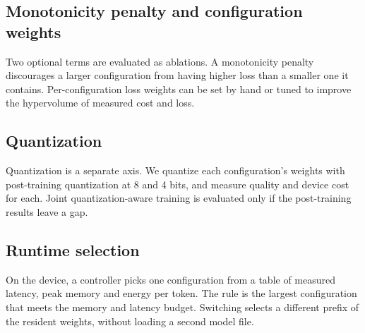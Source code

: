 \subsection{Monotonicity penalty and configuration weights}

Two optional terms are evaluated as ablations. A monotonicity penalty discourages a larger configuration from having higher loss than a smaller one it contains. Per-configuration loss weights can be set by hand or tuned to improve the hypervolume of measured cost and loss. 

\subsection{Quantization}

Quantization is a separate axis. We quantize each configuration's weights with post-training quantization at 8 and 4 bits, and measure quality and device cost for each. Joint quantization-aware training is evaluated only if the post-training results leave a gap. 

\subsection{Runtime selection}

On the device, a controller picks one configuration from a table of measured latency, peak memory and energy per token. The rule is the largest configuration that meets the memory and latency budget. Switching selects a different prefix of the resident weights, without loading a second model file. 
